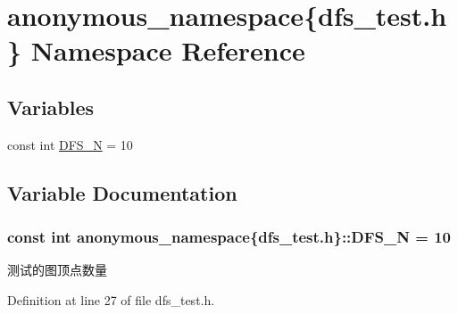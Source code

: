 \hypertarget{namespaceanonymous__namespace_02dfs__test_8h_03}{}\section{anonymous\+\_\+namespace\{dfs\+\_\+test.\+h\} Namespace Reference}
\label{namespaceanonymous__namespace_02dfs__test_8h_03}
\subsection*{Variables}
\begin{DoxyCompactItemize}
\item 
const int \hyperlink{namespaceanonymous__namespace_02dfs__test_8h_03_a37ec41bc82ae94b1f3736e26c9754ffb}{D\+F\+S\+\_\+\+N} = 10
\end{DoxyCompactItemize}


\subsection{Variable Documentation}
\hypertarget{namespaceanonymous__namespace_02dfs__test_8h_03_a37ec41bc82ae94b1f3736e26c9754ffb}{}
\subsubsection[{D\+F\+S\+\_\+\+N}]{\setlength{\rightskip}{0pt plus 5cm}const int anonymous\+\_\+namespace\{dfs\+\_\+test.\+h\}\+::D\+F\+S\+\_\+\+N = 10}\label{namespaceanonymous__namespace_02dfs__test_8h_03_a37ec41bc82ae94b1f3736e26c9754ffb}
测试的图顶点数量 

Definition at line 27 of file dfs\+\_\+test.\+h.

